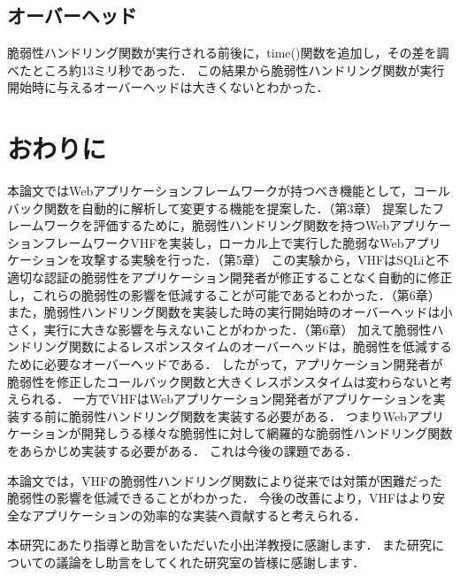 \documentclass[a4paper,12pt]{jreport}
\begin{document}
\section{オーバーヘッド}
脆弱性ハンドリング関数が実行される前後に，time()関数を追加し，その差を調べたところ約13ミリ秒であった．
この結果から脆弱性ハンドリング関数が実行開始時に与えるオーバーヘッドは大きくないとわかった．

\chapter{おわりに}
本論文ではWebアプリケーションフレームワークが持つべき機能として，コールバック関数を自動的に解析して変更する機能を提案した．（第3章）
提案したフレームワークを評価するために，脆弱性ハンドリング関数を持つWebアプリケーションフレームワークVHFを実装し，ローカル上で実行した脆弱なWebアプリケーションを攻撃する実験を行った．（第5章）
この実験から，VHFはSQLiと不適切な認証の脆弱性をアプリケーション開発者が修正することなく自動的に修正し，これらの脆弱性の影響を低減することが可能であるとわかった．（第6章）
また，脆弱性ハンドリング関数を実装した時の実行開始時のオーバーヘッドは小さく，実行に大きな影響を与えないことがわかった．（第6章）
加えて脆弱性ハンドリング関数によるレスポンスタイムのオーバーヘッドは，脆弱性を低減するために必要なオーバーヘッドである．
したがって，アプリケーション開発者が脆弱性を修正したコールバック関数と大きくレスポンスタイムは変わらないと考えられる．
一方でVHFはWebアプリケーション開発者がアプリケーションを実装する前に脆弱性ハンドリング関数を実装する必要がある．
つまりWebアプリケーションが開発しうる様々な脆弱性に対して網羅的な脆弱性ハンドリング関数をあらかじめ実装する必要がある．
これは今後の課題である．

本論文では，VHFの脆弱性ハンドリング関数により従来では対策が困難だった脆弱性の影響を低減できることがわかった．
今後の改善により，VHFはより安全なアプリケーションの効率的な実装へ貢献すると考えられる．

\begin{acknowledgement}
本研究にあたり指導と助言をいただいた小出洋教授に感謝します．
また研究についての議論をし助言をしてくれた研究室の皆様に感謝します．
\end{acknowledgement}



\end{document}

